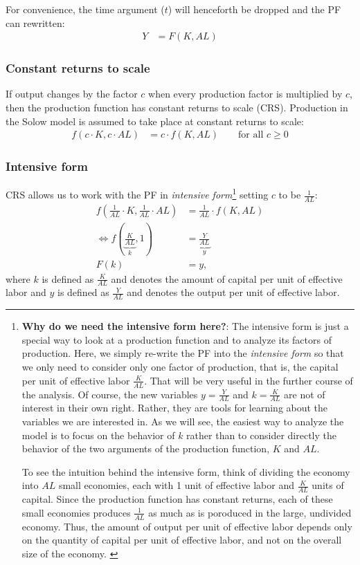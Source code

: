 For convenience, the time argument ($t$) will henceforth be dropped and the PF can rewritten:
\begin{align}
Y &= F(K,AL)
\end{align}

\pbn
\subsubsection{Constant returns to scale}

If output changes by the factor $c$ when every production factor is multiplied by $c$, then the production function has constant returns to scale (CRS). Production in the Solow model is assumed to take place at constant returns to scale:
\begin{align}
	f(c\cdot K, c \cdot AL)&=c \cdot f(K, AL) \qquad \text{for all } c\geq 0
\end{align}

\pbn
\subsubsection{Intensive form}
CRS allows us to work with the PF in \textit{intensive form}\footnote{\textbf{Why do we need the intensive form here?}:
The intensive form is just a special way to look at a production function and to analyze its factors of production. Here, we simply re-write the PF into the \textit{intensive form} so that we only need to consider only one factor of production, that is, the capital per unit of effective labor $\frac{K}{AL}$. That will be very useful in the further course of the analysis. Of course, the new variables $y=\frac{Y}{AL}$ and $k=\frac{K}{AL}$ are not of interest in their own right. Rather, they are tools for learning about the variables we are interested in. As we will see, the easiest way to analyze the model is to focus on the behavior of $k$ rather than to consider directly the behavior  of the two arguments of the production function, $K$ and $AL$. 

\pbn
To see the intuition behind the intensive form, think of dividing the economy into $AL$ small economies, each with 1 unit of effective labor and $\frac{K}{AL}$ units of capital. Since the production function has constant returns, each of these small economies produces $\frac{1}{AL}$ as much as is poroduced in the large, undivided economy. Thus, the amount of output per unit of effective labor depends only on the quantity of capital per unit of effective labor, and not on the overall size of the economy. \citep{Romer2006Advanced}} setting $c$ to  be $\frac{1}{AL}$:
\begin{align}
	f\left(\frac{1}{AL}\cdot K, \frac{1}{AL} \cdot AL\right) &=\frac{1}{AL} \cdot f(K, AL) \\
\Leftrightarrow	f\left(\underbrace{\frac{K}{AL}}_k, 1\right) &=  \underbrace{\frac{Y}{AL}}_y\\
 F(k)&=y,
\end{align}
where $k$ is defined as $\frac{K}{AL}$ and denotes the amount of capital per unit of effective labor and $y$ is defined as $\frac{Y}{AL}$ and denotes the output per unit of effective labor.

